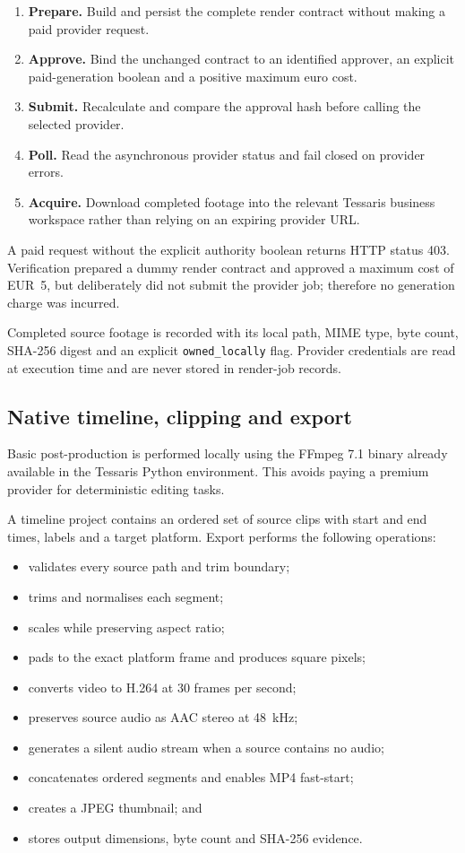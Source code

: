 \begin{enumerate}
    \item \textbf{Prepare.} Build and persist the complete render contract without
    making a paid provider request.
    \item \textbf{Approve.} Bind the unchanged contract to an identified approver,
    an explicit paid-generation boolean and a positive maximum euro cost.
    \item \textbf{Submit.} Recalculate and compare the approval hash before calling
    the selected provider.
    \item \textbf{Poll.} Read the asynchronous provider status and fail closed on
    provider errors.
    \item \textbf{Acquire.} Download completed footage into the relevant Tessaris
    business workspace rather than relying on an expiring provider URL.
\end{enumerate}

A paid request without the explicit authority boolean returns HTTP status 403.
Verification prepared a dummy render contract and approved a maximum cost of
EUR~5, but deliberately did not submit the provider job; therefore no generation
charge was incurred.

Completed source footage is recorded with its local path, MIME type, byte count,
SHA-256 digest and an explicit \texttt{owned\_locally} flag. Provider credentials
are read at execution time and are never stored in render-job records.

\subsection{Native timeline, clipping and export}

Basic post-production is performed locally using the FFmpeg 7.1 binary already
available in the Tessaris Python environment. This avoids paying a premium
provider for deterministic editing tasks.

A timeline project contains an ordered set of source clips with start and end
times, labels and a target platform. Export performs the following operations:

\begin{itemize}
    \item validates every source path and trim boundary;
    \item trims and normalises each segment;
    \item scales while preserving aspect ratio;
    \item pads to the exact platform frame and produces square pixels;
    \item converts video to H.264 at 30 frames per second;
    \item preserves source audio as AAC stereo at 48~kHz;
    \item generates a silent audio stream when a source contains no audio;
    \item concatenates ordered segments and enables MP4 fast-start;
    \item creates a JPEG thumbnail; and
    \item stores output dimensions, byte count and SHA-256 evidence.
\end{itemize}


